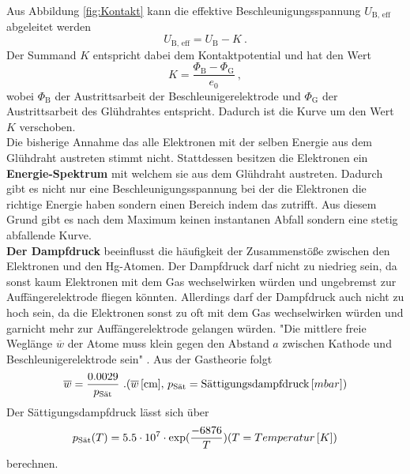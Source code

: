 Aus Abbildung \eqref{fig:Kontakt} kann die effektive Beschleunigungsspannung $U_\text{B, eff}$ abgeleitet werden
\begin{equation*}
	U_\text{B, eff} = U_\text{B} - K \ .
\end{equation*}
Der Summand $K$ entspricht dabei dem Kontaktpotential und hat den Wert
\begin{equation*}
	K = \frac{\Phi_\text{B} - \Phi_\text{G}}{e_0} \ ,
	\label{eqn:K}
\end{equation*}
wobei $\Phi_\text{B}$ der Austrittsarbeit der Beschleunigerelektrode und $\Phi_\text{G}$ der Austrittsarbeit des Glühdrahtes entspricht. Dadurch ist die Kurve um den Wert $K$ verschoben. \\
Die bisherige Annahme das alle Elektronen mit der selben Energie aus dem Glühdraht austreten stimmt nicht. Stattdessen besitzen die Elektronen ein \textbf{Energie-Spektrum} mit welchem sie aus dem Glühdraht austreten. Dadurch gibt es nicht nur eine Beschleunigungsspannung bei der die Elektronen die richtige Energie haben sondern einen Bereich indem das zutrifft. Aus diesem Grund gibt es nach dem Maximum keinen instantanen Abfall sondern eine stetig abfallende Kurve. \\
\textbf{Der Dampfdruck} beeinflusst die häufigkeit der Zusammenstöße zwischen den Elektronen und den Hg-Atomen. Der Dampfdruck darf nicht zu niedrieg sein, da sonst kaum Elektronen mit dem Gas wechselwirken würden und ungebremst zur Auffängerelektrode fliegen könnten. Allerdings darf der Dampfdruck auch nicht zu hoch sein, da die Elektronen sonst zu oft mit dem Gas wechselwirken würden und garnicht mehr zur Auffängerelektrode gelangen würden. "Die mittlere freie Weglänge $\overline{w}$ der Atome muss klein gegen den Abstand $a$ zwischen Kathode und Beschleunigerelektrode sein" \cite[6]{sample}. Aus der Gastheorie folgt
\begin{equation*}
	\overline{w} = \frac{0.0029}{p_\text{Sät}} \ . \\
	\label{eqn:w}
	(\overline{w}\, [\text{cm}],\, p_\text{Sät} = \text{Sättigungsdampfdruck}\, [mbar])
\end{equation*}
Der Sättigungsdampfdruck lässt sich über
\begin{equation*}
	p_\text{Sät}(T) = 5.5 \cdot 10^7 \cdot \exp(\frac{-6876}{T}) \\
	\label{eqn:p}
	(T = Temperatur\, [K])
\end{equation*}
berechnen.

























